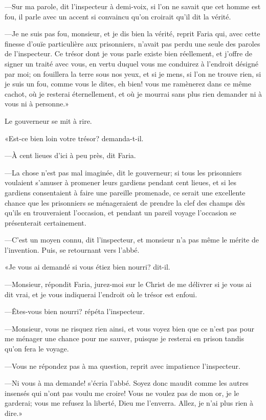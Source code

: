 —Sur ma parole, dit l'inspecteur à demi-voix, si l'on ne savait que cet homme est fou, il parle avec un accent si convaincu qu'on croirait qu'il dit la vérité.

—Je ne suis pas fou, monsieur, et je dis bien la vérité, reprit Faria qui, avec cette finesse d'ouïe particulière aux prisonniers, n'avait pas perdu une seule des paroles de l'inspecteur. Ce trésor dont je vous parle existe bien réellement, et j'offre de signer un traité avec vous, en vertu duquel vous me conduirez à l'endroit désigné par moi; on fouillera la terre sous nos yeux, et si je mens, si l'on ne trouve rien, si je suis un fou, comme vous le dites, eh bien! vous me ramènerez dans ce même cachot, où je resterai éternellement, et où je mourrai sans plus rien demander ni à vous ni à personne.»

Le gouverneur se mit à rire.

«Est-ce bien loin votre trésor? demanda-t-il.

—À cent lieues d'ici à peu près, dit Faria.

—La chose n'est pas mal imaginée, dit le gouverneur; si tous les prisonniers voulaient s'amuser à promener leurs gardiens pendant cent lieues, et si les gardiens consentaient à faire une pareille promenade, ce serait une excellente chance que les prisonniers se ménageraient de prendre la clef des champs dès qu'ils en trouveraient l'occasion, et pendant un pareil voyage l'occasion se présenterait certainement.

—C'est un moyen connu, dit l'inspecteur, et monsieur n'a pas même le mérite de l'invention. Puis, se retournant vers l'abbé.

«Je vous ai demandé si vous étiez bien nourri? dit-il.

—Monsieur, répondit Faria, jurez-moi sur le Christ de me délivrer si je vous ai dit vrai, et je vous indiquerai l'endroit où le trésor est enfoui.

—Êtes-vous bien nourri? répéta l'inspecteur.

—Monsieur, vous ne risquez rien ainsi, et vous voyez bien que ce n'est pas pour me ménager une chance pour me sauver, puisque je resterai en prison tandis qu'on fera le voyage.

—Vous ne répondez pas à ma question, reprit avec impatience l'inspecteur.

—Ni vous à ma demande! s'écria l'abbé. Soyez donc maudit comme les autres insensés qui n'ont pas voulu me croire! Vous ne voulez pas de mon or, je le garderai; vous me refusez la liberté, Dieu me l'enverra. Allez, je n'ai plus rien à dire.»

